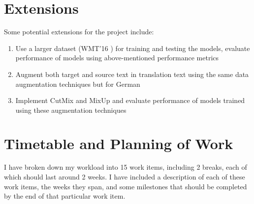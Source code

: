 \documentclass[60pt]{article}
\begin{document}
\section{Extensions}
\par
Some potential extensions for the project include:
\begin{enumerate}
    \item Use a larger dataset (WMT'16 \cite{bojar-EtAl:2016:WMT1}) for training and testing the models, evaluate performance of models using above-mentioned performance metrics
    \item Augment both target and source text in translation text using the same data augmentation techniques but for German
    \item Implement CutMix and MixUp and evaluate performance of models trained using these augmentation techniques
\end{enumerate}

\section{Timetable and Planning of Work}
\par
I have broken down my workload into 15 work items, including 2 breaks, each of which should last around 2 weeks. I have included a description of each of these work items, the weeks they span, and some milestones that should be completed by the end of that particular work item.
\end{document}
